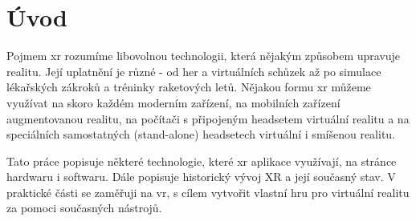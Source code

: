 \chapter*{Úvod}

Pojmem \gls{xr} rozumíme libovolnou technologii, která nějakým způsobem upravuje realitu. Její uplatnění je různé - od her a virtuálních schůzek až po simulace lékařských zákroků a tréninky raketových letů. \cite{muni_kybernetika} Nějakou formu \gls{xr} můžeme využívat na skoro každém moderním zařízení, na mobilních zařízení augmentovanou realitu, na počítači s připojeným headsetem virtuální realitu a na speciálních samostatných (stand-alone) headsetech virtuální i smíšenou realitu. 

Tato práce popisuje některé technologie, které \gls{xr} aplikace využívají, na stránce hardwaru i softwaru. Dále popisuje historický vývoj XR a její současný stav. V praktické části se zaměřuji na \gls{vr}, s cílem vytvořit vlastní hru pro virtuální realitu za pomoci současných nástrojů.